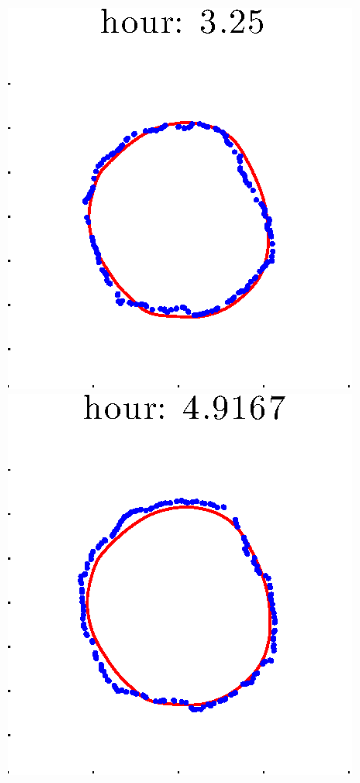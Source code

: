 \documentclass[12pt]{article}
\begin{document}
\begin{figure}[h!]
\begin{subfigure}[b]{.3\textwidth}
		\includegraphics[height=.15\textheight]{Pos0/full/first3.eps}
		\includegraphics[height=.15\textheight]{Pos0/full/first4.eps}

\end{subfigure}
\end{figure}
\end{document}
